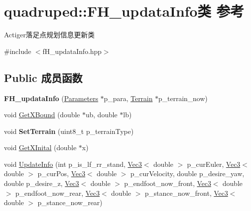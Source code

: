 \hypertarget{classquadruped_1_1FH__updataInfo}{}\section{quadruped\+:\+:F\+H\+\_\+updata\+Info类 参考}
\label{classquadruped_1_1FH__updataInfo}


Actiger落足点规划信息更新类  




{\ttfamily \#include $<$f\+H\+\_\+updata\+Info.\+hpp$>$}

\subsection*{Public 成员函数}
\begin{DoxyCompactItemize}
\item 
\mbox{\label{classquadruped_1_1FH__updataInfo_a02285dcf0fbee8e7fe0b632648b9e8e9}} 
{\bfseries F\+H\+\_\+updata\+Info} (\hyperlink{classquadruped_1_1Parameters}{Parameters} $\ast$p\+\_\+para, \hyperlink{classquadruped_1_1Terrain}{Terrain} $\ast$p\+\_\+terrain\+\_\+now)
\item 
void \hyperlink{classquadruped_1_1FH__updataInfo_a1ef2f860fc18a7176f6b9ffc694778ee}{Get\+X\+Bound} (double $\ast$ub, double $\ast$lb)
\item 
\mbox{\label{classquadruped_1_1FH__updataInfo_a8c3842af225ae629a1db0fe201c3cabc}} 
void {\bfseries Set\+Terrain} (uint8\+\_\+t p\+\_\+terrain\+Type)
\item 
void \hyperlink{classquadruped_1_1FH__updataInfo_a75b04f959df3aee0f49e0c8627754792}{Get\+X\+Inital} (double $\ast$x)
\item 
void \hyperlink{classquadruped_1_1FH__updataInfo_a4f87f044f37ed293b1e86802cf41345f}{Update\+Info} (int p\+\_\+is\+\_\+lf\+\_\+rr\+\_\+stand, \hyperlink{cppTypes_8h_a65c27bf97693676535dd0b30ea0ad399}{Vec3}$<$ double $>$ p\+\_\+cur\+Euler, \hyperlink{cppTypes_8h_a65c27bf97693676535dd0b30ea0ad399}{Vec3}$<$ double $>$ p\+\_\+cur\+Pos, \hyperlink{cppTypes_8h_a65c27bf97693676535dd0b30ea0ad399}{Vec3}$<$ double $>$ p\+\_\+cur\+Velocity, double p\+\_\+desire\+\_\+yaw, double p\+\_\+desire\+\_\+z, \hyperlink{cppTypes_8h_a65c27bf97693676535dd0b30ea0ad399}{Vec3}$<$ double $>$ p\+\_\+endfoot\+\_\+now\+\_\+front, \hyperlink{cppTypes_8h_a65c27bf97693676535dd0b30ea0ad399}{Vec3}$<$ double $>$ p\+\_\+endfoot\+\_\+now\+\_\+rear, \hyperlink{cppTypes_8h_a65c27bf97693676535dd0b30ea0ad399}{Vec3}$<$ double $>$ p\+\_\+stance\+\_\+now\+\_\+front, \hyperlink{cppTypes_8h_a65c27bf97693676535dd0b30ea0ad399}{Vec3}$<$ double $>$ p\+\_\+stance\+\_\+now\+\_\+rear)
\end{DoxyCompactItemize}

